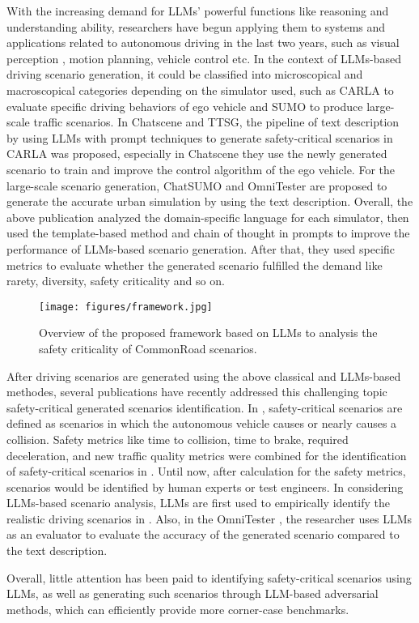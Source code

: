 With the increasing demand for LLMs' powerful functions like reasoning and understanding ability, researchers have begun applying them to systems and applications related to autonomous driving in the last two years, such as visual perception \cite{wu2023language}, motion planning\cite{wang2024dualad}, vehicle control\cite{xu2024drivegpt4} etc. In the context of LLMs-based driving scenario generation, it could be classified into microscopical and macroscopical categories depending on the simulator used, such as CARLA to evaluate specific driving behaviors of ego vehicle and SUMO to produce large-scale traffic scenarios. In Chatscene \cite{zhang2024chatscene} and TTSG\cite{ruan2024traffic}, the pipeline of text description by using LLMs with prompt techniques to generate safety-critical scenarios in CARLA was proposed, especially in Chatscene \cite{zhang2024chatscene} they use the newly generated scenario to train and improve the control algorithm of the ego vehicle. For the large-scale scenario generation, ChatSUMO \cite{li2024chatsumo} and OmniTester \cite{lu2024multimodal} are proposed to generate the accurate urban simulation by using the text description. Overall, the above publication analyzed the domain-specific language for each simulator, then used the template-based method and chain of thought in prompts to improve the performance of LLMs-based scenario generation. After that, they used specific metrics to evaluate whether the generated scenario fulfilled the demand like rarety, diversity, safety criticality and so on.
\begin{figure*}[ht]
    \centering
    \texttt{[image: figures/framework.jpg]} 
    \caption{Overview of the proposed framework based on LLMs to analysis the safety criticality of CommonRoad scenarios.}
    \label{fig:framework} %
\end{figure*}

After driving scenarios are generated using the above classical and LLMs-based methodes, several publications have recently addressed this challenging topic safety-critical generated scenarios identification. In \cite{song2023critical}, safety-critical scenarios are defined as scenarios in which the autonomous vehicle causes or nearly causes a collision. Safety metrics like time to collision, time to brake, required deceleration, and new traffic
quality metrics were combined for the identification of safety-critical scenarios in  \cite{hallerbach2018simulation}. Until now, after calculation for the safety metrics, scenarios would be identified by human experts or test engineers. In considering LLMs-based scenario analysis, LLMs are first used to empirically identify the realistic driving scenarios in \cite{wu2024reality}. Also, in the OmniTester \cite{lu2024multimodal}, the researcher uses LLMs as an evaluator to evaluate the accuracy of the generated scenario compared to the text description. 

Overall, little attention has been paid to identifying safety-critical scenarios using LLMs, as well as generating such scenarios through LLM-based adversarial methods, which can efficiently provide more corner-case benchmarks.
